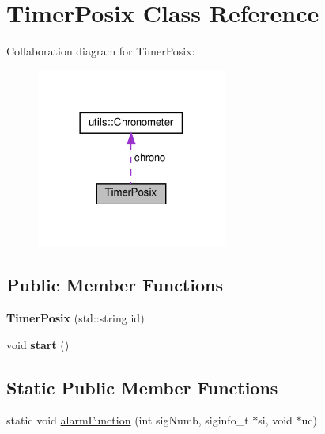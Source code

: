 \hypertarget{classTimerPosix}{}\section{Timer\+Posix Class Reference}
\label{classTimerPosix}


Collaboration diagram for Timer\+Posix\+:
\nopagebreak
\begin{figure}[H]
\begin{center}
\leavevmode
\includegraphics[width=177pt]{classTimerPosix__coll__graph}
\end{center}
\end{figure}
\subsection*{Public Member Functions}
\begin{DoxyCompactItemize}
\item 
\mbox{\label{classTimerPosix_ae358f5c54efabea8f110b9476e747951}} 
{\bfseries Timer\+Posix} (std\+::string id)
\item 
\mbox{\label{classTimerPosix_ab15271c50cd9cc4306fc8a454df1e36f}} 
void {\bfseries start} ()
\end{DoxyCompactItemize}
\subsection*{Static Public Member Functions}
\begin{DoxyCompactItemize}
\item 
static void \hyperlink{classTimerPosix_af7cfc4df52fb786aac3ceb435e32c0bf}{alarm\+Function} (int sig\+Numb, siginfo\+\_\+t $\ast$si, void $\ast$uc)
\end{DoxyCompactItemize}
